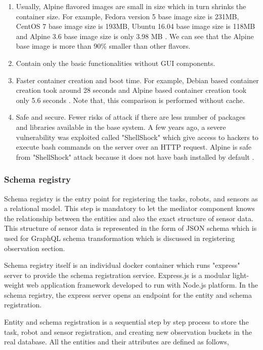 	\begin{enumerate}
		\item Usually, Alpine flavored images are small in size which in turn shrinks the container size. For example, Fedora version 5 base image size is 231MB, CentOS 7 base image size is 193MB, Ubuntu 16.04 base image size is 118MB and Alpine 3.6 base image size is only 3.98 MB \cite{misc16}. We can see that the Alpine base image is more than 90\% smaller than other flavors. 
		\item Contain only the basic functionalities without GUI components. 
		\item Faster container creation and boot time. For example, Debian based container creation took around 28 seconds and Alpine based container creation took only 5.6 seconds \cite{misc16}. Note that, this comparison is performed without cache.
		\item Safe and secure. Fewer risks of attack if there are less number of packages and libraries available in the base system. A few years ago,  a severe vulnerability was exploited called "ShellShock" which give access to hackers to execute bash commands on the server over an HTTP request. Alpine is safe from "ShellShock" attack because it does not have bash installed by default \cite{misc16}.	
	\end{enumerate}
	
	\subsubsection{Schema registry} \label{subsubsection:schema_registry}
	
	Schema registry is the entry point for registering the tasks, robots, and sensors as a relational model. This step is mandatory to let the mediator component knows the relationship between the entities and also the exact structure of sensor data. This structure of sensor data is represented in the form of JSON schema which is used for GraphQL schema transformation which is discussed in registering observation section. 
	
	Schema registry itself is an individual docker container which runs "express" server to provide the schema registration service. Express.js is a modular light-weight web application framework developed to run with Node.js platform. In the schema registry, the express server opens an endpoint for the entity and schema registration.
	
	Entity and schema registration is a sequential step by step process to store the task, robot and sensor registration, and creating new observation buckets in the real database. All the entities and their attributes are defined as follows,
	
